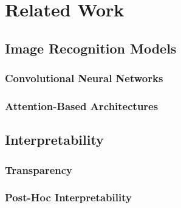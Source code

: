 \chapter{Related Work}

\section{Image Recognition Models}

\subsection{Convolutional Neural Networks}

\subsection{Attention-Based Architectures}


\section{Interpretability}

\subsection{Transparency}

\subsection{Post-Hoc Interpretability}



